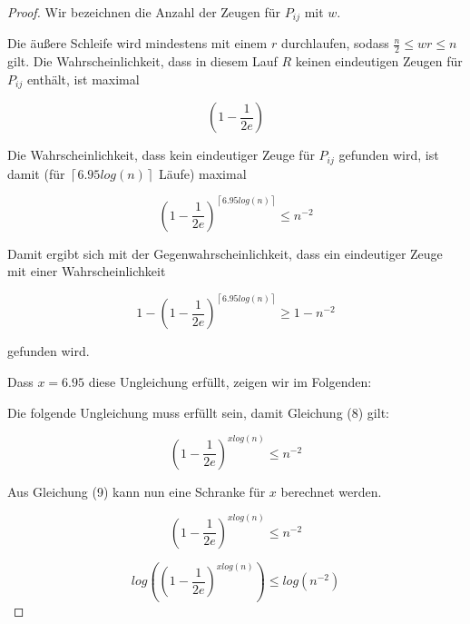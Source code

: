 \documentclass{article}
\begin{document}
\begin{proof}
  Wir bezeichnen die Anzahl der Zeugen f{\"u}r $P_{ij}$ mit $w$.

  Die {\"a}u{\ss}ere Schleife wird mindestens mit einem $r$ durchlaufen, sodass
  $\frac{n}{2} \leq wr \leq n$ gilt. Die Wahrscheinlichkeit, dass in diesem Lauf
  $R$ keinen eindeutigen Zeugen f{\"u}r $P_{ij}$ enth{\"a}lt, ist maximal

  \begin{equation}
    \left( 1 - \frac{1}{2e} \right)
  \end{equation}

  Die Wahrscheinlichkeit, dass kein eindeutiger Zeuge f{\"u}r $P_{ij}$ gefunden
  wird, ist damit (f{\"u}r $\left\lceil 6.95 log(n) \right\rceil$ L{\"a}ufe)
  maximal
  
  \begin{equation}
    \left( 1 - \frac{1}{2e} \right)^{\left\lceil 6.95 log(n) \right\rceil} \leq n^{-2}
  \end{equation}

  \clearpage

  Damit ergibt sich mit der Gegenwahrscheinlichkeit, dass ein eindeutiger Zeuge
  mit einer Wahrscheinlichkeit

  \begin{equation}
    1 - \left( 1 - \frac{1}{2e} \right)^{\left\lceil 6.95 log(n) \right\rceil} \geq 1 - n^{-2}
  \end{equation}

  gefunden wird.

  Dass $x = 6.95$ diese Ungleichung erf{\"u}llt, zeigen wir im Folgenden:

  Die folgende Ungleichung muss erf{\"u}llt sein, damit Gleichung (8) gilt:

  \begin{equation}
    \left( 1 - \frac{1}{2e} \right)^{x log(n)} \leq n^{-2}
  \end{equation}

  Aus Gleichung (9) kann nun eine Schranke f{\"u}r $x$ berechnet werden.

  \begin{equation}
    \left( 1 - \frac{1}{2e} \right)^{x log(n)} \leq n^{-2}
  \end{equation}

  \begin{equation}
    log \left( \left( 1 - \frac{1}{2e} \right)^{x log(n)} \right) \leq log \left( n^{-2} \right)
  \end{equation}


\end{proof}
\end{document}

